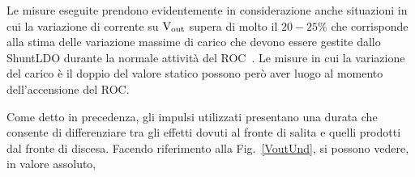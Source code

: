 Le misure eseguite prendono evidentemente in considerazione anche situazioni in cui la variazione di corrente su $\mathrm{V_{out}}$ supera di molto il $20-25\%$ che corrisponde alla stima delle  variazione massime di carico che devono essere gestite dallo ShuntLDO durante la normale attivit\`a del ROC~\cite{saramarconi}. Le misure in cui la variazione del carico è il doppio del valore statico possono per\`o aver luogo al momento dell'accensione del ROC. %

Come detto in precedenza, gli impulsi utilizzati presentano una durata che consente di differenziare tra gli effetti dovuti al fronte di salita e quelli prodotti dal fronte di discesa. 
Facendo riferimento alla Fig.~\ref{VoutUnd}, si possono vedere, in valore assoluto,

